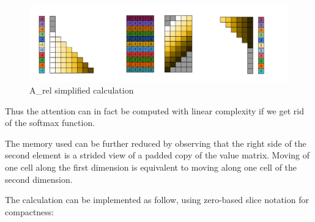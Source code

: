 \begin{figure}
\centering
\includegraphics{images/S_rel_V_detailed.png}
\caption{A\_rel simplified calculation}
\end{figure}

Thus the attention can in fact be computed with linear complexity if we
get rid of the softmax function.

The memory used can be further reduced by observing that the right side
of the second element is a strided view of a padded copy of the value
matrix. Moving of one cell along the first dimension is equivalent to
moving along one cell of the second dimension.

The calculation can be implemented as follow, using zero-based slice
notation for compactness:

